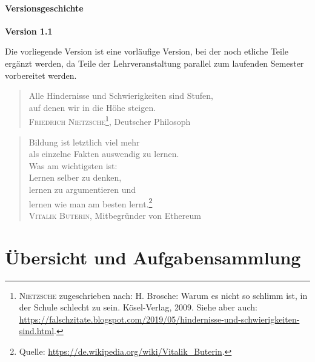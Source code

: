 \documentclass[a4paper]{article}%
\begin{document}
\clearpage

\subsection*{Versionsgeschichte}


\textbf{Version 1.1}

Die vorliegende Version ist eine vorläufige Version, bei der noch etliche Teile ergänzt werden, da Teile der Lehrveranstaltung
parallel zum laufenden Semester vorbereitet werden.



\clearpage

\vspace*{\fill}

{\raggedright
\begin{quote}
Alle Hindernisse und Schwierigkeiten sind Stufen,\\
auf denen wir in die Höhe steigen.\\[12pt]
\hfill \textsc{Friedrich Nietzsche}\footnote{\textsc{Nietzsche} zugeschrieben nach: H. Brosche: Warum es nicht so schlimm ist, in der Schule
schlecht zu sein. Kösel-Verlag, 2009. Siehe aber auch: \url{https://falschzitate.blogspot.com/2019/05/hindernisse-und-schwierigkeiten-sind.html}.}, Deutscher Philosoph
\end{quote}
}


{\raggedright
\begin{quote}
Bildung ist letztlich viel mehr \\ als einzelne Fakten auswendig zu lernen.\\
Was am wichtigsten ist: \\ Lernen selber zu denken, \\ lernen zu argumentieren und \\ lernen wie man am besten lernt.\footnote{Quelle: \url{https://de.wikipedia.org/wiki/Vitalik\_Buterin}.}\\[12pt]
\hfill\textsc{Vitalik Buterin}, Mitbegründer von Ethereum
\end{quote}
}

\clearpage


\clearpage

\pagebreak\hypertarget{Inhaltsverzeichnis}{}
\tableofcontents


\clearpage


\part{Übersicht und Aufgabensammlung}
\end{document}
